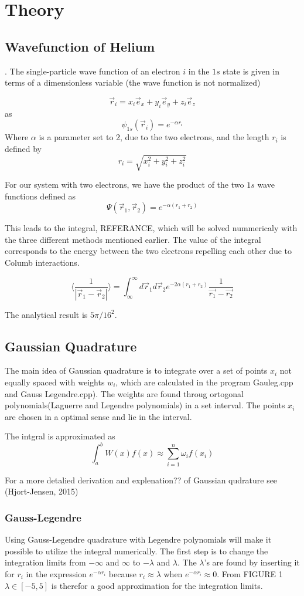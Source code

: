 \documentclass[../main.tex]{subfiles}
\begin{document}
\section{Theory} \label{sec:theory}
\subsection{Wavefunction of Helium} \label{sec:QMProb}.
The single-particle wave function of an electron $i$ in the $1s$ state is given in terms of a dimensionless variable (the wave function is not normalized)

\[\vec{r}_i = x_i \vec{e}_x + y_i \vec{e}_y + z_i \vec{e}_z\]
as
\[\psi_{1s}(\vec{r}_i) = e^{-\alpha r_i}\]
Where $\alpha$ is a parameter set to 2, due to the two electrons, and the length $r_i$ is defined by
\[r_i = \sqrt{x_i^2 + y_i^2 + z_i^2}\]

For our system with two electrons, we have the product of the two $1s$ wave functions defined as
\[\Psi(\vec{r}_1, \vec{r}_2) = e^{-\alpha(r_1 + r_2)}\]

This leads to the integral, REFERANCE, which will be solved nummericaly with the three different methods mentioned earlier.
The value of the integral corresponds to the energy between the two electrons repelling each other due to Columb interactions.

\[\langle \frac{1}{|\vec{r}_1 - \vec{r}_2|} \rangle = \int_{\infty}^\infty d\vec{r}_1 d\vec{r}_2 e^{-2\alpha(r_1 + r_2)} \frac{1}{\vec{r_1} - \vec{r_2}}\]
\vspace{1cm}

The analytical result is $5\pi/16^2$.

\subsection{Gaussian Quadrature} \label{sec:GQ}
The main idea of Gaussian quadrature is to integrate over a set of points $x_i$ not equally spaced with weights $w_i$, which are calculated in  the program Gauleg.cpp and Gauss Legendre.cpp). The weights are found throug ortogonal polynomials(Laguerre and Legendre polynomials) in a set interval. The points $x_i$ are chosen in a optimal sense and lie in the interval.

The intgral is approximated as
\[\int_a^b W(x)f(x) \approx \sum_{i=1}^n \omega_i f(x_i) \]

For a more detalied derivation and explenation?? of Gaussian qudrature see (Hjort-Jensen, 2015)


\subsubsection{Gauss-Legendre}\label{sec:GLQ}
Using Gauss-Legendre quadrature with Legendre polynomials will make it possible to utilize the integral numerically. The first step is to change the integration limits from  $-\infty$ and $\infty$ to $-\lambda$ and $\lambda$. The $\lambda$'s are found by inserting it for $r_i$ in the expression $e^{-\alpha r_i}$ because $r_i \approx \lambda$ when $e^{-\alpha r_i} \approx 0$. From FIGURE 1 $\lambda \in [-5,5]$ is therefor a good approximation for the integration limits.
\end{document}
